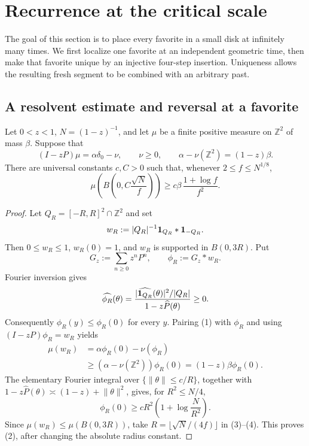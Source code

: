 \section{Recurrence at the critical scale}\label{sec:recurrence}
The goal of this section is to place every favorite in a small disk at infinitely
many times. We first localize one favorite at an independent geometric time,
then make that favorite unique by an injective four-step insertion. Uniqueness
allows the resulting fresh segment to be combined with an arbitrary past.

\subsection{A resolvent estimate and reversal at a favorite}

\begin{lemma}\label{lem:stopped-resolvent}
Let \(0<z<1\), \(N=(1-z)^{-1}\), and let \(\mu\) be a finite positive
measure on \(\mathbb Z^2\) of mass \(\beta\).  Suppose that
\begin{equation}
(I-zP)\mu=\alpha\delta_0-\nu,\qquad \nu\ge0,
       \qquad \alpha-\nu(\mathbb Z^2)=(1-z)\beta.                 \tag{1}
\end{equation}
There are universal constants \(c,C>0\) such that, whenever
\(2\le f\le N^{1/8}\),
\begin{equation}
\mu\left(B\left(0,C\frac{\sqrt N}{f}\right)\right)
       \ge c\beta\,\frac{1+\log f}{f^2}.                         \tag{2}
\end{equation}
\end{lemma}

\begin{proof}
Let \(Q_R=[-R,R]^2\cap\mathbb Z^2\) and set
\[
 w_R:=|Q_R|^{-1}{\bf1}_{Q_R}*{\bf1}_{-Q_R}.
\]
Then \(0\le w_R\le1\), \(w_R(0)=1\), and \(w_R\) is supported in
\(B(0,3R)\).  Put
\[
 G_z:=\sum_{n\ge0}z^nP^n,\qquad \phi_R:=G_z*w_R.
\]
Fourier inversion gives
\[
 \widehat{\phi_R}(\theta)=
 \frac{|\widehat{{\bf1}_{Q_R}}(\theta)|^2/|Q_R|}
      {1-z\widehat P(\theta)}\ge0.
\]
Consequently \(\phi_R(y)\le\phi_R(0)\) for every \(y\).  Pairing (1) with
\(\phi_R\) and using \((I-zP)\phi_R=w_R\) yields
\begin{equation}
\begin{split}
 \mu(w_R)
 &=\alpha\phi_R(0)-\nu(\phi_R)\\
 &\ge(\alpha-\nu(\mathbb Z^2))\phi_R(0)
   =(1-z)\beta\phi_R(0).                                      \tag{3}
\end{split}
\end{equation}
The elementary Fourier integral over
\(\{\lVert\theta\rVert\le c/R\}\), together with
\(1-z\widehat P(\theta)\asymp (1-z)+\lVert\theta\rVert^2\),
gives, for \(R^2\le N/4\),
\begin{equation}
\phi_R(0)\ge cR^2\left(1+\log\frac N{R^2}\right).              \tag{4}
\end{equation}
Since \(\mu(w_R)\le\mu(B(0,3R))\), take
\(R=\lfloor\sqrt N/(4f)\rfloor\) in (3)--(4).  This proves (2),
after changing the absolute radius constant.
\end{proof}

